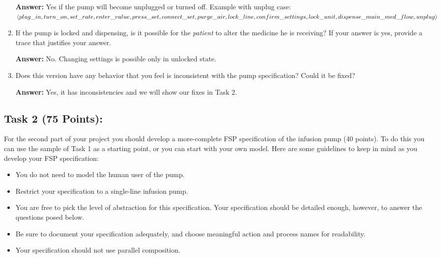 \documentclass{article}
\newcommand{\head}{\subsection*}
\begin{document}
\begin{enumerate}
    \textbf{Answer:} Yes if the pump will become unplugged or turned off. Example with unplug case:\\
    $\langle plug\_in, turn\_on, set\_rate, enter\_value, press\_set, connect\_set, purge\_air, lock\_line, confirm\_settings,\\lock\_unit, dispense\_main\_med\_flow, unplug\rangle$
    
    \item If the pump is locked and dispensing, is it possible for the \emph{patient} to alter the medicine he is receiving? If your answer is yes, provide a trace that justifies your answer.
    
    \textbf{Answer:} No. Changing settings is possible only in unlocked state.
    
    \item Does this version have any behavior that you feel is inconsistent with the pump specification? Could it be fixed?
    
    \textbf{Answer:} Yes, it has inconsistencies and we will show our fixes in Task 2.
    
\end{enumerate}

\head{Task 2 (75 Points):}

For the second part of your project you should develop a
more-complete FSP specification of the infusion pump (40 points). To
do this you can use the sample of Task 1 as a starting point, or you
can start with your own model. Here are some guidelines to keep in
mind as you develop your FSP specification:

\begin{itemize}
\item You do not need to model the human user of the pump.

\item Restrict your specification to a single-line infusion pump.

\item You are free to pick the level of abstraction for this specification. Your specification
should be detailed enough, however, to answer the questions posed below.

\item Be sure to document your specification adequately, and choose meaningful action and process names for readability.

\item Your specification should not use parallel composition.

\end{itemize}
\end{document}
